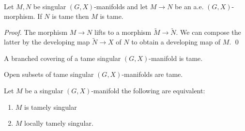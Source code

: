 \begin{lem}\label{lem:embedding_tame}
Let $M,N$ be singular $(G,X)$-manifolds and let $M\rightarrow N$ be an a.e. $(G,X)$-morphism. If $N$ is tame then $M$ is tame.
\end{lem}
\begin{proof}
 The morphism $M\rightarrow N$ lifts to a morphism $\widetilde M\rightarrow \widetilde N$. We can compose the latter by the developing map $\widetilde N \rightarrow X$ of $N$ to obtain a developing map of $M$. 
\qed\end{proof}
\begin{cor}\label{cor:branched_covering_tame_singular} A branched covering of a tame  singular $(G,X)$-manifold is tame.
\end{cor}
\begin{cor}\label{cor:open_subsets_tame_singular} Open subsets of tame singular $(G,X)$-manifolds are tame.
\end{cor}



\begin{thm} \label{theo:local_tame}  Let $M$ be a singular $(G,X)$-manifold the following are equivalent:
\begin{enumerate}
 \item $M$ is tamely singular 
 \item $M$ locally tamely singular.
\end{enumerate}



\end{thm}


